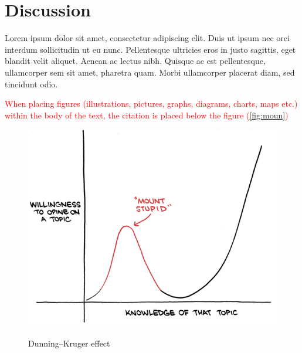 \vfill

\newpage 

\section{Discussion}
Lorem ipsum dolor sit amet, consectetur adipiscing elit. Duis ut ipsum nec orci interdum sollicitudin ut eu nunc. Pellentesque ultricies eros in justo sagittis, eget blandit velit aliquet. Aenean ac lectus nibh. Quisque ac est pellentesque, ullamcorper sem sit amet, pharetra quam. Morbi ullamcorper placerat diam, sed tincidunt odio.

\textcolor{red}{When placing figures (illustrations, pictures, graphs, diagrams, charts, maps etc.) within the body of the text, the citation is placed below the figure (\autoref{fig:moun})}

\begin{figure}[!h]
  \centering
  \includegraphics [scale=0.5]{Images/dunning_kruger.png} \\
  {\small {\it \caption{Dunning–Kruger effect \label{fig:moun} }}}
\end{figure}